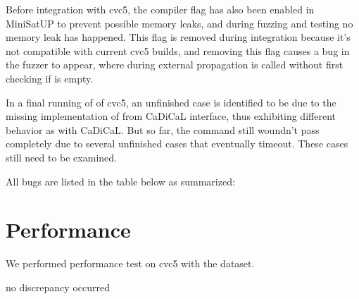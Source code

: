 Before integration with cvc5, the compiler flag  has also been enabled in MiniSatUP to prevent possible memory leaks, and during fuzzing and testing no memory leak has happened. This flag is removed during integration because it's not compatible with current cvc5 builds, and removing this flag causes a bug in the fuzzer to appear, where during external propagation  is called without first checking if  is empty.


In a final running of  of cvc5, an unfinished case is identified to be due to the missing implementation of  from CaDiCaL interface, thus exhibiting different behavior as with CaDiCaL. But so far, the  command still woundn't pass completely due to several unfinished cases that eventually timeout. These cases still need to be examined.

All bugs are listed in the table below as summarized:


\section{Performance}


We performed performance test on cvc5 with the dataset.


no discrepancy occurred
